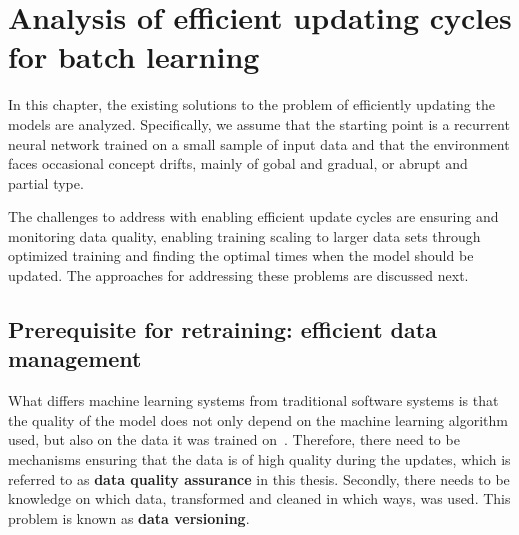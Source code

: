 



\chapter{Analysis of efficient updating cycles for batch learning}

In this chapter, the existing solutions to the problem of efficiently updating the models are analyzed. Specifically, we assume that the starting point is a recurrent neural network trained on a small sample of input data and that the environment faces occasional concept drifts, mainly of gobal and gradual, or abrupt and partial type.

The challenges to address with enabling efficient update cycles are ensuring and monitoring data quality, enabling training scaling to larger data sets through optimized training and finding the optimal times when the model should be updated. The approaches for addressing these problems are discussed next.

\section[Prerequisite for retraining: efficient data management]{Prerequisite for retraining: efficient data \\management}

What differs machine learning systems from traditional software systems is that the quality of the model does not only depend on the machine learning algorithm used, but also on the data it was trained on~\cite{polyzotisDataLifecycleChallenges2018}. Therefore, there need to be mechanisms ensuring that the data is of high quality during the updates, which is referred to as \textbf{data quality assurance} in this thesis. Secondly, there needs to be knowledge on which data, transformed and cleaned in which ways, was used. This problem is known as \textbf{data versioning}.

